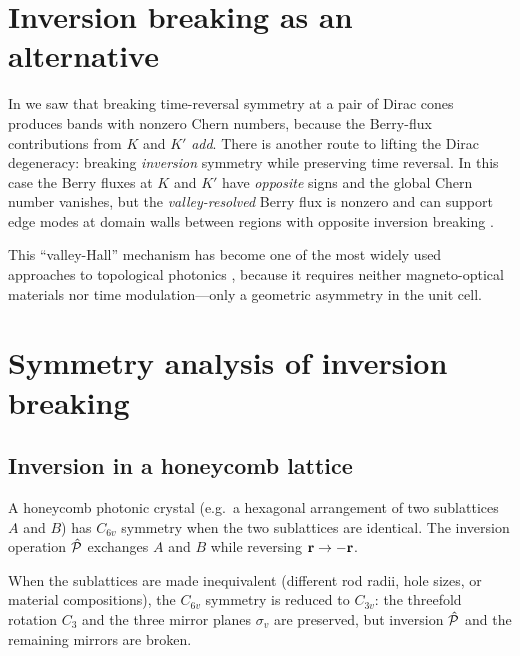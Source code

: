 
\section{Inversion breaking as an alternative}
\label{sec:ch12-inversion-breaking}

In  we saw that breaking time-reversal symmetry
at a pair of Dirac cones produces bands with nonzero Chern numbers,
because the Berry-flux contributions from $K$ and $K'$ \emph{add}.
There is another route to lifting the Dirac degeneracy: breaking
\emph{inversion} symmetry while preserving time reversal.  In this case
the Berry fluxes at $K$ and $K'$ have \emph{opposite} signs and the
global Chern number vanishes, but the \emph{valley-resolved} Berry flux
is nonzero and can support edge modes at domain walls between regions
with opposite inversion breaking
\cite{kang2018pseudo}.

This ``valley-Hall'' mechanism has become one of the most widely used
approaches to topological photonics
\cite{ma2016all,dong2016valley,ozawa2018topological}, because it requires neither
magneto-optical materials nor time modulation---only a geometric
asymmetry in the unit cell.

\section{Symmetry analysis of inversion breaking}
\label{sec:ch12-symmetry}

\subsection{Inversion in a honeycomb lattice}
\label{sec:ch12-inversion-honeycomb}

A honeycomb photonic crystal (e.g.\ a hexagonal arrangement of two
sublattices $A$ and $B$) has $C_{6v}$ symmetry when the two sublattices
are identical.  The inversion operation $\hat{\mathcal{P}}$ exchanges $A$ and $B$
while reversing $\mathbf{r}\to-\mathbf{r}$.

When the sublattices are made inequivalent (different rod radii, hole
sizes, or material compositions), the $C_{6v}$ symmetry is reduced to
$C_{3v}$: the threefold rotation $C_3$ and the three mirror planes
$\sigma_v$ are preserved, but inversion $\hat{\mathcal{P}}$ and the remaining
mirrors are broken.

